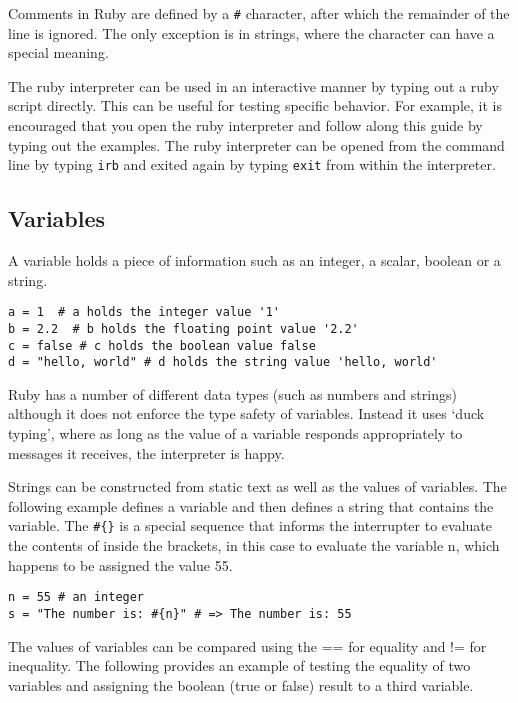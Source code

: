 \begin{bibunit}
Comments in Ruby are defined by a \texttt{\#} character, after which the remainder of the line is ignored. The only exception is in strings, where the character can have a special meaning.

The ruby interpreter can be used in an interactive manner by typing out a ruby script directly. This can be useful for testing specific behavior. For example, it is encouraged that you open the ruby interpreter and follow along this guide by typing out the examples. The ruby interpreter can be opened from the command line by typing \texttt{irb} and exited again by typing \texttt{exit} from within the interpreter.

\subsection{Variables}
A variable holds a piece of information such as an integer, a scalar, boolean or a string.

\begin{lstlisting}
a = 1  # a holds the integer value '1'
b = 2.2  # b holds the floating point value '2.2'
c = false # c holds the boolean value false
d = "hello, world" # d holds the string value 'hello, world'

\end{lstlisting}

Ruby has a number of different data types (such as numbers and strings) although it does not enforce the type safety of variables. Instead it uses `duck typing', where as long as the value of a variable responds appropriately to messages it receives, the interpreter is happy.

Strings can be constructed from static text as well as the values of variables. The following example defines a variable and then defines a string that contains the variable. The \texttt{\#\{\}} is a special sequence that informs the interrupter to evaluate the contents of inside the brackets, in this case to evaluate the variable n, which happens to be assigned the value 55.

\begin{lstlisting}
n = 55 # an integer 
s = "The number is: #{n}" # => The number is: 55
\end{lstlisting}

The values of variables can be compared using the == for equality and != for inequality. The following provides an example of testing the equality of two variables and assigning the boolean (true or false) result to a third variable.


\end{bibunit}
